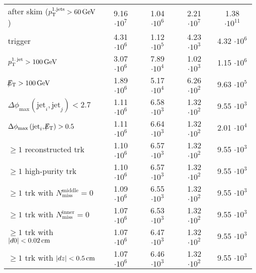 \begin{table}[!h]
{\begin{tabular}{|l|c|c|c|c|}
after skim ($p_{\text{T}}^{\text{1.jets}}>60\,\text{Ge}\kern-0.06667em\text{V}$)                                                                             & 9.16 $\cdot10^{7 }$ & 1.04 $\cdot10^{6 }$ & 2.21 $\cdot10^{7 }$ & 1.38 $\cdot10^{11}$ \\
trigger                                                                                   & 4.31 $\cdot10^{6 }$ & 1.12 $\cdot10^{5 }$ & 4.23 $\cdot10^{3 }$ & 4.32 $\cdot10^{6 }$ \\
$p_{\text{T}}^{\text{1.\,jet}}>100\,\text{Ge}\kern-0.06667em\text{V}$                                                                     & 3.07 $\cdot10^{6 }$ & 7.89 $\cdot10^{4 }$ & 1.02 $\cdot10^{3 }$ & 1.15 $\cdot10^{6 }$ \\
$\slash\mkern-12mu{E}_{\text{T}}>100\,\text{Ge}\kern-0.06667em\text{V}$                                                                            & 1.89 $\cdot10^{6 }$ & 5.17 $\cdot10^{4 }$ & 6.26 $\cdot10^{2 }$ & 9.63 $\cdot10^{5 }$ \\
$\Delta\phi_{\text{max}} \left( \text{jet}_i, \text{jet}_j  \right)<2.7$                     & 1.11 $\cdot10^{6 }$ & 6.58 $\cdot10^{3 }$ & 1.32 $\cdot10^{2 }$ & 9.55 $\cdot10^{3 }$ \\
$\Delta\phi_{\text{max}} \left( \text{jet}_i, \slash\mkern-12mu{E}_{\text{T}}  \right)>0.5$                             & 1.11 $\cdot10^{6 }$ & 6.64 $\cdot10^{3 }$ & 1.32 $\cdot10^{2 }$ & 2.01 $\cdot10^{4 }$ \\
$\geq1$ reconstructed trk                                                                 & 1.10 $\cdot10^{6 }$ & 6.57 $\cdot10^{3 }$ & 1.32 $\cdot10^{2 }$ & 9.55 $\cdot10^{3 }$ \\
$\geq1$ high-purity trk                                                                   & 1.10 $\cdot10^{6 }$ & 6.57 $\cdot10^{3 }$ & 1.32 $\cdot10^{2 }$ & 9.55 $\cdot10^{3 }$ \\
$\geq1$ trk with $N_{\text{miss}}^{\text{middle}}=0$                                             & 1.09 $\cdot10^{6 }$ & 6.55 $\cdot10^{3 }$ & 1.32 $\cdot10^{2 }$ & 9.55 $\cdot10^{3 }$ \\
$\geq1$ trk with $N_{\text{miss}}^{\text{inner}}=0$                                              & 1.07 $\cdot10^{6 }$ & 6.53 $\cdot10^{3 }$ & 1.32 $\cdot10^{2 }$ & 9.55 $\cdot10^{3 }$ \\
$\geq1$ trk with $|d0|<0.02\,\text{cm}$                                                           & 1.07 $\cdot10^{6 }$ & 6.47 $\cdot10^{3 }$ & 1.32 $\cdot10^{2 }$ & 9.55 $\cdot10^{3 }$ \\
$\geq1$ trk with $|dz|<0.5\,\text{cm}$                                                            & 1.07 $\cdot10^{6 }$ & 6.46 $\cdot10^{3 }$ & 1.32 $\cdot10^{2 }$ & 9.55 $\cdot10^{3 }$ \\

\end{tabular}}
\end{table}

